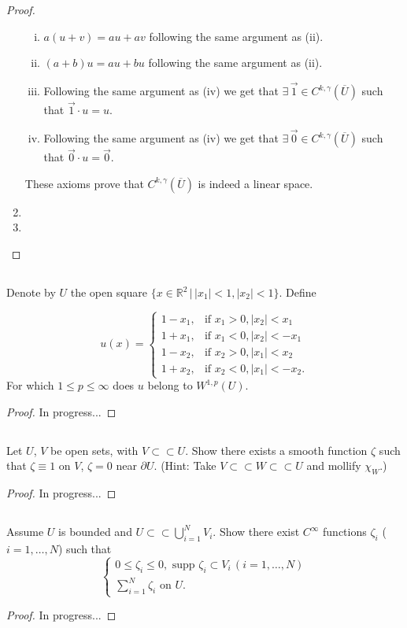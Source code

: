 \documentclass[11pt]{article}
\begin{document}
\begin{proof}
\begin{enumerate}[1.]
\begin{enumerate}[(i)]
				\item $a(u + v) = au + av$ following the same argument as (ii).
				\item $(a+b)u = au + bu$ following the same argument as (ii).
				\item Following the same argument as (iv) we get that $\exists \, \vec{1} \in C^{k,\gamma}(\overline{U})$
					such that $\vec{1} \cdot u = u$.
				\item Following the same argument as (iv) we get that $\exists \, \vec{0} \in C^{k,\gamma}(\overline{U})$
					such that $\vec{0} \cdot u = \vec{0}$.
			\end{enumerate}
			These axioms prove that $C^{k,\gamma}(\overline{U})$ is indeed a linear space.
		\newpage
		\item 
		\item
	\end{enumerate}
\end{proof}

\newpage

\setcounter{subsection}{2}
\subsection{}
Denote by $U$ the open square $\{x \in \mathbb{R}^2 \, | \, |x_1| < 1, |x_2| < 1\}$. Define

\[
u(x) =
\begin{cases} 
	1 - x_1, & \text{if } x_1 > 0, |x_2| < x_1 \\
	1 + x_1, & \text{if } x_1 < 0, |x_2| < -x_1 \\
	1 - x_2, & \text{if } x_2 > 0, |x_1| < x_2 \\
	1 + x_2, & \text{if } x_2 < 0, |x_1| < -x_2.
\end{cases}
\]
For which $1 \leq p \leq \infty$ does $u$ belong to $W^{1,p}(U)$.
\begin{proof}
In progress...
\end{proof}

\setcounter{subsection}{4}
\subsection{}
Let $U$, $V$ be open sets, with $V\subset\subset U$. Show there exists a smooth function $\zeta$ such that
$\zeta \equiv 1$ on $V$, $\zeta = 0$ near $\partial U$. (Hint: Take $V \subset\subset W \subset\subset U$ and mollify $\chi_W$.)
\begin{proof}
In progress...
\end{proof}

\subsection{}
Assume $U$ is bounded and $U \subset\subset \bigcup_{i=1}^{N}V_i$. Show there exist $C^{\infty}$ functions $\zeta_i$ ($i=1,\dots,N$)
such that
\[
\begin{cases}
	0 \leq \zeta_i \leq 0, \text{ supp } \zeta_i \subset V_i \,(i=1,\dots,N)\\
	\sum_{i=1}^{N} \zeta_i \text{ on } U.
\end{cases}
\]
\begin{proof}
In progress...
\end{proof}
\end{document}
